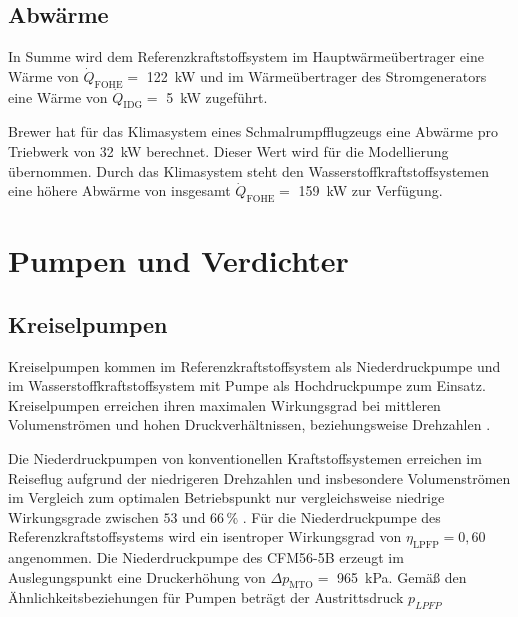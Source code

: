 \subsection{Abwärme}

In Summe wird dem Referenzkraftstoffsystem im Hauptwärmeübertrager eine Wärme von $\dot{Q}_{\mathrm{FOHE}}=$ \SI{122}{\kilo\W} und im Wärmeübertrager des Stromgenerators eine Wärme von $\dot{Q}_{\mathrm{IDG}}=$ \SI{5}{\kilo\W} zugeführt. 

Brewer \cite{Brewer.1991} hat für das Klimasystem eines Schmalrumpfflugzeugs eine Abwärme pro Triebwerk von \SI{32}{\kilo\W} berechnet. Dieser Wert wird für die Modellierung übernommen. Durch das Klimasystem steht den Wasserstoffkraftstoffsystemen eine höhere Abwärme von insgesamt $\dot{Q}_{\mathrm{FOHE}}=$ \SI{159}{\kilo\W} zur Verfügung.

\section{Pumpen und Verdichter}

\subsection{Kreiselpumpen}

Kreiselpumpen kommen im Referenzkraftstoffsystem als Niederdruckpumpe und im Wasserstoffkraftstoffsystem mit Pumpe als Hochdruckpumpe zum Einsatz. Kreiselpumpen erreichen ihren maximalen Wirkungsgrad bei mittleren Volumenströmen und hohen Druckverhältnissen, beziehungsweise Drehzahlen \cite{Gulich.2013}. %


Die Niederdruckpumpen von konventionellen Kraftstoffsystemen erreichen im Reiseflug aufgrund der niedrigeren Drehzahlen und insbesondere Volumenströmen im Vergleich zum optimalen Betriebspunkt nur vergleichsweise niedrige Wirkungsgrade zwischen $53$ und $66\,\%$ \cite{Zhou.2023}. Für die Niederdruckpumpe des Referenzkraftstoffsystems wird ein isentroper Wirkungsgrad von $\eta_{\mathrm{LPFP}}=0,60$ angenommen. Die Niederdruckpumpe des CFM56-5B erzeugt im Auslegungspunkt eine Druckerhöhung von $\Delta p_{\mathrm{MTO}}=$ \SI{965}{\kilo\Pa}. Gemäß den Ähnlichkeitsbeziehungen für Pumpen \cite{Gulich.2013} beträgt der Austrittsdruck $p_{LPFP}$ 

